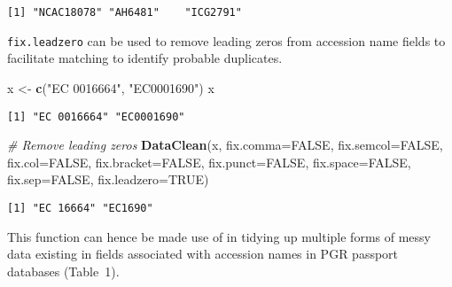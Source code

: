 \documentclass[]{article}
\newenvironment{Shaded}{\begin{snugshade}}{\end{snugshade}}
\newcommand{\CommentTok}[1]{\textcolor[rgb]{0.56,0.35,0.01}{\textit{#1}}}
\newcommand{\DataTypeTok}[1]{\textcolor[rgb]{0.13,0.29,0.53}{#1}}
\newcommand{\KeywordTok}[1]{\textcolor[rgb]{0.13,0.29,0.53}{\textbf{#1}}}
\newcommand{\NormalTok}[1]{#1}
\newcommand{\OtherTok}[1]{\textcolor[rgb]{0.56,0.35,0.01}{#1}}
\newcommand{\StringTok}[1]{\textcolor[rgb]{0.31,0.60,0.02}{#1}}
\begin{document}
\begin{verbatim}
[1] "NCAC18078" "AH6481"    "ICG2791"  
\end{verbatim}

\texttt{fix.leadzero} can be used to remove leading zeros from accession
name fields to facilitate matching to identify probable duplicates.

\begin{Shaded}
\begin{Highlighting}[]
\NormalTok{x <-}\StringTok{ }\KeywordTok{c}\NormalTok{(}\StringTok{"EC 0016664"}\NormalTok{, }\StringTok{"EC0001690"}\NormalTok{)}
\NormalTok{x}
\end{Highlighting}
\end{Shaded}

\begin{verbatim}
[1] "EC 0016664" "EC0001690" 
\end{verbatim}

\begin{Shaded}
\begin{Highlighting}[]
\CommentTok{# Remove leading zeros}
\KeywordTok{DataClean}\NormalTok{(x, }\DataTypeTok{fix.comma=}\OtherTok{FALSE}\NormalTok{, }\DataTypeTok{fix.semcol=}\OtherTok{FALSE}\NormalTok{, }\DataTypeTok{fix.col=}\OtherTok{FALSE}\NormalTok{,}
          \DataTypeTok{fix.bracket=}\OtherTok{FALSE}\NormalTok{, }\DataTypeTok{fix.punct=}\OtherTok{FALSE}\NormalTok{, }\DataTypeTok{fix.space=}\OtherTok{FALSE}\NormalTok{, }\DataTypeTok{fix.sep=}\OtherTok{FALSE}\NormalTok{,}
          \DataTypeTok{fix.leadzero=}\OtherTok{TRUE}\NormalTok{)}
\end{Highlighting}
\end{Shaded}

\begin{verbatim}
[1] "EC 16664" "EC1690"  
\end{verbatim}

This function can hence be made use of in tidying up multiple forms of
messy data existing in fields associated with accession names in PGR
passport databases (Table~1).

\begin{Shaded}
\end{Shaded}
\end{document}
